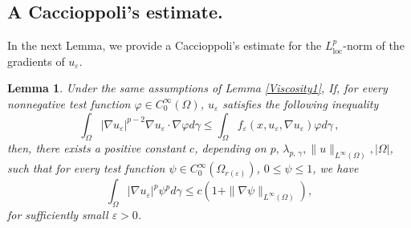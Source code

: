 \documentclass[12pt]{amsart}
\newtheorem{lemma}[theorem]{Lemma}
\newcommand{\1}{\mathbf 1}
\begin{document}
\subsection{A Caccioppoli's estimate.}

In the next Lemma, we provide a Caccioppoli's estimate for the $L^p_{\mathrm{loc}}$-norm of the gradients of $u_\varepsilon$.

\begin{lemma}\label{Caccioppoli}
Under the same assumptions of Lemma \ref{Viscosity1}, {   If, for every nonnegative test function $\varphi\in C^{\infty}_0(\Omega)$, $u_\varepsilon$ satisfies the following inequality
\begin{equation}\label{newassumption}
\int_{\Omega}|\nabla u_\varepsilon|^{p-2}\nabla u_\varepsilon\cdot \nabla \varphi d\gamma \leq \int_\Omega  f_\varepsilon(x,u_\varepsilon,\nabla u_\varepsilon)\varphi d\gamma \,,
\end{equation}}
then, there exists a positive constant $c$, depending on $p,\,\lambda_{p,\,\gamma},\|u\|_{L^{\infty}(\Omega)},|\Omega|$,  such that for every test function $\psi\in C^{\infty}_0(\Omega_{r(\varepsilon)})$, $ 0\leq \psi \leq 1$, we have
\begin{equation}\label{Caccioppoli ineq}
\int_{\Omega} |\nabla u_\varepsilon|^p \psi^p d\gamma \leq c(1+\|\nabla \psi\|_{L^{\infty}(\Omega)}),
\end{equation}
for sufficiently small $\varepsilon>0$.
\end{lemma}
\end{document}
